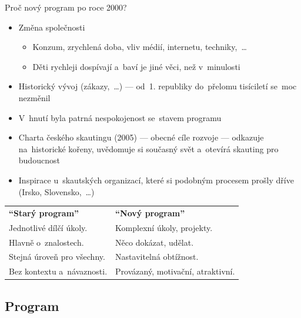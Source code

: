 \documentclass[compress, xelatex, 11pt, xcolor=dvipsnames, aspectratio=169, url={hyphens, lowtilde}]{beamer}
\begin{document}
\begin{frame}{Proč nový program po roce 2000?}
	\begin{itemize}
		\item Změna společnosti
		\begin{itemize}
			\item Konzum, zrychlená doba, vliv médií, internetu, techniky,~\ldots
			\item Děti rychleji dospívají a~baví je jiné věci, než v~minulosti
		\end{itemize}
		\item Historický vývoj (zákazy,~\ldots) --- od~1. republiky do~přelomu tisíciletí se~moc nezměnil
		\item V~hnutí byla patrná nespokojenost se~stavem programu
		\item Charta českého skautingu (2005) --- obecné cíle rozvoje --- odkazuje na~historické kořeny, uvědomuje si současný svět a~otevírá skauting pro budoucnost
		\item Inspirace u~skautských organizací, které si podobným procesem prošly dříve (Irsko, Slovensko,~\ldots)
	\end{itemize}
	\begin{center}
		\begin{tabular}{ll}
			\textbf{\enquote{Starý program}} & \textbf{\enquote{Nový program}}\\
			Jednotlivé dílčí úkoly. & Komplexní úkoly, projekty.\\
			Hlavně o~znalostech. & Něco dokázat, udělat.\\
			Stejná úroveň pro všechny. & Nastavitelná obtížnost.\\
			Bez kontextu a~návaznosti. & Provázaný, motivační, atraktivní.
		\end{tabular}
	\end{center}
\end{frame}

\subsection{Program}
\end{document}
